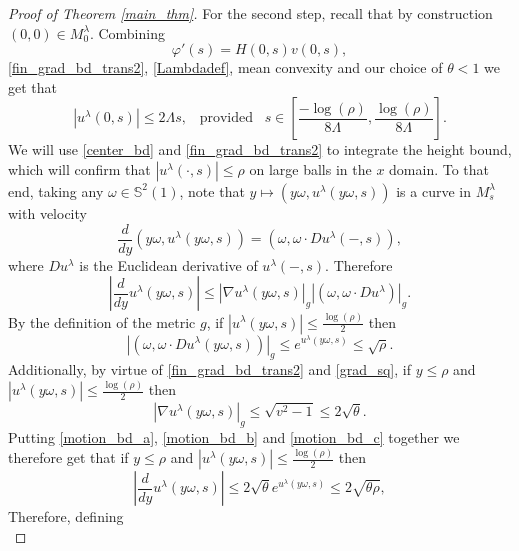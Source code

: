 \documentclass[leqno,11pt]{amsart}
\theoremstyle{definition}
\begin{document}
\begin{proof}[Proof of Theorem \ref{main_thm}]
{For the second step, recall that by }construction $(0,0)\in M^{\lambda}_0$. Combining 
\[
\varphi'(s)=H(0,s)v(0,s),
\]
\eqref{fin_grad_bd_trans2}, \eqref{Lambdadef}, mean convexity and our choice of $\theta<1$ we get  that 
\begin{equation}\label{center_bd}
|u^{\lambda}(0,s)| \leq 2\Lambda s,\;\;\; \textrm{provided}\;\;\;s\in \left[\frac{-\log(\rho)}{8\Lambda}, \frac{\log(\rho)}{8\Lambda} \right].
\end{equation}
{We will use \eqref{center_bd} and \eqref{fin_grad_bd_trans2} to integrate the height bound, which will confirm that $|u^{\lambda}(\cdot,s)| \leq \rho$ on large balls in the $x$ domain. To that end,} taking any $\omega \in \mathbb{S}^2(1)$, { note that $y\mapsto (y\omega,u^{\lambda}(y\omega,s))$ is a curve in $M^{\lambda}_s$ with velocity 
\begin{equation}
\frac{d}{dy}(y\omega,u^{\lambda}(y\omega,s))=(\omega,\omega\cdot Du^{\lambda}(-,s)),
\end{equation}
{where $Du^{\lambda}$ is the Euclidean derivative of $u^{\lambda}(-,s)$.} Therefore
\begin{equation}\label{motion_bd_a}
\left|\frac{d}{dy}u^{\lambda}(y\omega,s)\right| \leq |\nabla u^{\lambda}(y\omega,s)|_g \left|(\omega, \omega \cdot Du^{\lambda})\right|_{g}.
\end{equation}
By the definition of the metric $g$, if $|u^{\lambda}(y\omega,s)| \leq \frac{\log(\rho)}{2}$ then 
\begin{equation}\label{motion_bd_b}
\left|(\omega, \omega \cdot Du^{\lambda}(y\omega,s))\right|_g \leq e^{u^{\lambda}(y\omega,s)}\leq \sqrt{\rho}.
\end{equation}
}
Additionally,  by virtue  of \eqref{fin_grad_bd_trans2} and \eqref{grad_sq}, if $y\leq \rho$ and $|u^{\lambda}(y\omega,s)| \leq \frac{\log(\rho)}{2}$ then  
\begin{equation}\label{motion_bd_c}
|\nabla u^{\lambda}(y\omega,s)|_g \leq \sqrt{v^2-1} \leq 2\sqrt{\theta}.
\end{equation}
Putting \eqref{motion_bd_a}, \eqref{motion_bd_b} and \eqref{motion_bd_c} together we therefore get that if $y\leq \rho$ and $|u^{\lambda}(y\omega,s)| \leq \frac{\log(\rho)}{2}$ then 
\begin{equation}\label{motion_bd}
\left|\frac{d}{dy}u^{\lambda}(y\omega,s)\right| \leq 2\sqrt{\theta}e^{u^{\lambda}(y\omega,s)} \leq 2\sqrt{\theta \rho},
\end{equation}
Therefore, defining 
\begin{equation}\label{rho_def}

\end{equation}
\end{proof}
\end{document}
